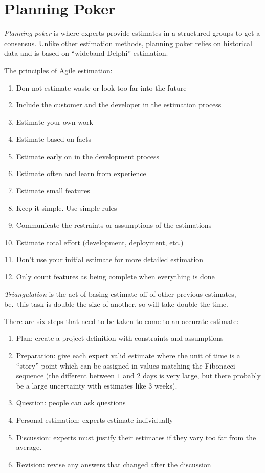 \section{Planning Poker}\label{sec:planning_poker}

\emph{Planning poker} is where experts provide estimates in a structured groups to get a consensus.
Unlike other estimation methods, planning poker relies on historical data and is based on ``wideband Delphi'' estimation.

The principles of Agile estimation:
\begin{enumerate}
	\item Don not estimate waste or look too far into the future
	\item Include the customer and the developer in the estimation process
	\item Estimate your own work
	\item Estimate based on facts
	\item Estimate early on in the development process
	\item Estimate often and learn from experience
	\item Estimate small features
	\item Keep it simple. Use simple rules
	\item Communicate the restraints or assumptions of the estimations
	\item Estimate total effort (development, deployment, etc.)
	\item Don't use your initial estimate for more detailed estimation
	\item Only count features as being complete when everything is done
\end{enumerate}
%
\emph{Triangulation} is the act of basing estimate off of other previous estimates, be.\ this task is double the size of another, so will take double the time.

There are six steps that need to be taken to come to an accurate estimate:
\begin{enumerate}
	\item Plan: create a project definition with constraints and assumptions
	\item Preparation: give each expert valid estimate where the unit of time is a ``story'' point which can be assigned in values matching the Fibonacci sequence (the different between \(1\) and \(2\) days is very large, but there probably be a large uncertainty with estimates like \(3\) weeks).
	\item Question: people can ask questions
	\item Personal estimation: experts estimate individually
	\item Discussion: experts must justify their estimates if they vary too far from the average.
	\item Revision: revise any answers that changed after the discussion
\end{enumerate}

